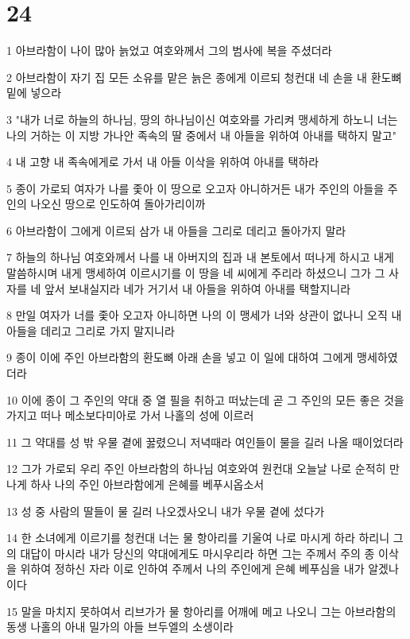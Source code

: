 \chapter{24}

\par 1 아브라함이 나이 많아 늙었고 여호와께서 그의 범사에 복을 주셨더라
\par 2 아브라함이 자기 집 모든 소유를 맡은 늙은 종에게 이르되 청컨대 네 손을 내 환도뼈 밑에 넣으라
\par 3 "내가 너로 하늘의 하나님, 땅의 하나님이신 여호와를 가리켜 맹세하게 하노니 너는 나의 거하는 이 지방 가나안 족속의 딸 중에서 내 아들을 위하여 아내를 택하지 말고"
\par 4 내 고향 내 족속에게로 가서 내 아들 이삭을 위하여 아내를 택하라
\par 5 종이 가로되 여자가 나를 좇아 이 땅으로 오고자 아니하거든 내가 주인의 아들을 주인의 나오신 땅으로 인도하여 돌아가리이까
\par 6 아브라함이 그에게 이르되 삼가 내 아들을 그리로 데리고 돌아가지 말라
\par 7 하늘의 하나님 여호와께서 나를 내 아버지의 집과 내 본토에서 떠나게 하시고 내게 말씀하시며 내게 맹세하여 이르시기를 이 땅을 네 씨에게 주리라 하셨으니 그가 그 사자를 네 앞서 보내실지라 네가 거기서 내 아들을 위하여 아내를 택할지니라
\par 8 만일 여자가 너를 좇아 오고자 아니하면 나의 이 맹세가 너와 상관이 없나니 오직 내 아들을 데리고 그리로 가지 말지니라
\par 9 종이 이에 주인 아브라함의 환도뼈 아래 손을 넣고 이 일에 대하여 그에게 맹세하였더라
\par 10 이에 종이 그 주인의 약대 중 열 필을 취하고 떠났는데 곧 그 주인의 모든 좋은 것을 가지고 떠나 메소보다미아로 가서 나홀의 성에 이르러
\par 11 그 약대를 성 밖 우물 곁에 꿇렸으니 저녁때라 여인들이 물을 길러 나올 때이었더라
\par 12 그가 가로되 우리 주인 아브라함의 하나님 여호와여 원컨대 오늘날 나로 순적히 만나게 하사 나의 주인 아브라함에게 은혜를 베푸시옵소서
\par 13 성 중 사람의 딸들이 물 길러 나오겠사오니 내가 우물 곁에 섰다가
\par 14 한 소녀에게 이르기를 청컨대 너는 물 항아리를 기울여 나로 마시게 하라 하리니 그의 대답이 마시라 내가 당신의 약대에게도 마시우리라 하면 그는 주께서 주의 종 이삭을 위하여 정하신 자라 이로 인하여 주께서 나의 주인에게 은혜 베푸심을 내가 알겠나이다
\par 15 말을 마치지 못하여서 리브가가 물 항아리를 어깨에 메고 나오니 그는 아브라함의 동생 나홀의 아내 밀가의 아들 브두엘의 소생이라
